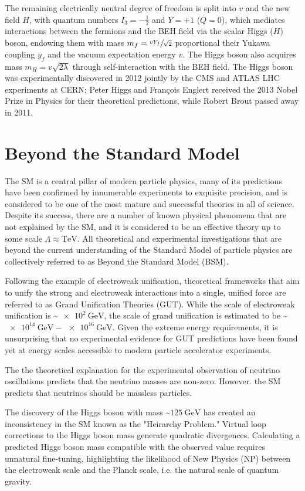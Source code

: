 The remaining electrically neutral degree of freedom is split into $v$ and the new field $H$, with quantum numbers $I_3 = -\frac{1}{2}$ and $Y = +1$ ($Q = 0$), which mediates interactions between the fermions and the BEH field via the scalar Higgs ($H$) boson, endowing them with mass $m_f = \sfrac{v Y_f}{\sqrt{2}}$ proportional their Yukawa coupling $y_f$ and the vacuum expectation energy $v$.
The Higgs boson also acquires mass $m_H = v \sqrt{2 \lambda}$ through self-interaction with the BEH field.
The Higgs boson was experimentally discovered in 2012 jointly by the CMS and ATLAS LHC experiments at CERN; Peter Higgs and François Englert received the 2013 Nobel Prize in Physics for their theoretical predictions, while Robert Brout passed away in 2011.

\section{Beyond the Standard Model}
The SM is a central pillar of modern particle physics, many of its predictions have been confirmed by innumerable experiments to exquisite precision, and is considered to be one of the most mature and successful theories in all of science.
Despite its success, there are a number of known physical phenomena that are not explained by the SM, and it is considered to be an effective theory up to some scale $\Lambda \approx \si{\TeV}$.
All theoretical and experimental investigations that are beyond the current understanding of the Standard Model of particle physics are collectively referred to as Beyond the Standard Model (BSM).

Following the example of electroweak unification, theoretical frameworks that aim to unify the strong and electroweak interactions into a single, unified force are referred to as Grand Unification Theories (GUT).
While the scale of electroweak unification is \sim$\SI{e2}{\GeV}$, the scale of grand unification is estimated to be \sim$\SI{e14}{\GeV} - \SI{e16}{\GeV}$.
Given the extreme energy requirements, it is unsurprising that no experimental evidence for GUT predictions have been found yet at energy scales accessible to modern particle accelerator experiments.

The the theoretical explanation for the experimental observation of neutrino oscillations predicts that the neutrino masses are non-zero.
However. the SM predicts that neutrinos should be massless particles. 

The discovery of the Higgs boson with mass \sim$\SI{125}{\GeV}$ has created an inconsistency in the SM known as the "Heirarchy Problem."
Virtual loop corrections to the Higgs boson mass generate quadratic divergences.
Calculating a predicted Higgs boson mass compatible with the observed value requires unnatural fine-tuning, highlighting the likelihood of New Physics (NP) between the electroweak scale and the Planck scale, i.e. the natural scale of quantum gravity.

